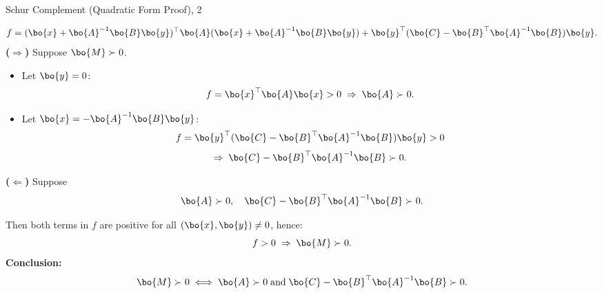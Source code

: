 \documentclass{beamer}
\begin{document}
\begin{frame}{Schur Complement (Quadratic Form Proof), 2}
	\begin{flushleft}
		{\small
		\textcolor{mygray}{
		\[
			f = 
			(\bo{x} + \bo{A}^{-1}\bo{B}\bo{y})^\top 
			\bo{A} 
			(\bo{x} + \bo{A}^{-1}\bo{B}\bo{y})
			+ \bo{y}^\top (\bo{C} - \bo{B}^\top \bo{A}^{-1}\bo{B}) \bo{y}.
		\]
		}
		\textbf{($\Rightarrow$)} Suppose $\bo{M} \succ 0$.
		\begin{itemize}
			\item Let $\bo{y} = 0$:
			\[
			f = \bo{x}^\top \bo{A} \bo{x} > 0 \;\Rightarrow\; \bo{A} \succ 0.
			\]
			
			\item Let $\bo{x} = -\bo{A}^{-1}\bo{B}\bo{y}$:
			\[
			f = \bo{y}^\top (\bo{C} - \bo{B}^\top \bo{A}^{-1}\bo{B}) \bo{y} > 0
			\]
			\[
			\Rightarrow\; \bo{C} - \bo{B}^\top \bo{A}^{-1}\bo{B} \succ 0.
			\]
		\end{itemize}
		\textbf{($\Leftarrow$)} Suppose 
		\[
		\bo{A} \succ 0, \quad 
		\bo{C} - \bo{B}^\top \bo{A}^{-1}\bo{B} \succ 0.
		\]
		
		Then both terms in $f$ are positive for all $(\bo{x},\bo{y}) \neq 0$, hence:
		\[
		f > 0 \;\Rightarrow\; \bo{M} \succ 0.
		\]
		\textbf{Conclusion:}
		\[
		\bo{M} \succ 0 
		\;\Longleftrightarrow\;
		\bo{A} \succ 0 \;\text{and}\;
		\bo{C} - \bo{B}^\top \bo{A}^{-1}\bo{B} \succ 0.
		\]}
		
	\end{flushleft}
\end{frame}
\end{document}
